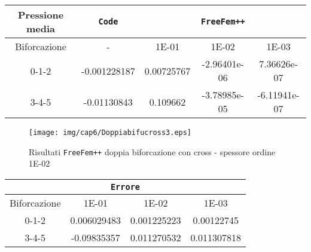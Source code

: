 \begin{center}
\begin{tabular}{|c|c|c|c|c|}
\hline
 Pressione media & \textbf{\texttt{Code}} & \multicolumn{3}{|c|}{\textbf{\texttt{FreeFem++}}} \\ 
\hline
\multicolumn{1}{|c|}{Biforcazione} & - &
\multicolumn{1}{|c|}{1E-01} & 1E-02 & 1E-03 \\
\hline
  0-1-2 & -0.001228187 & 0.00725767 & -2.96401e-06 & 7.36626e-07 \\
  3-4-5 & -0.01130843 & 0.109662 & -3.78985e-05 & -6.11941e-07 \\
\hline
\end{tabular}
\end{center}

\begin{center}
\begin{figure}[h!]
\centering
\texttt{[image: img/cap6/Doppiabifucross3.eps]}
\caption{Risultati \texttt{FreeFem++} doppia biforcazione con cross - spessore ordine 1E-02 }\label{DoppiaBifuCross1E-02}
\end{figure}
\end{center}

\begin{center}
\begin{tabular}{|c|c|c|c|}
\hline
  \multicolumn{4}{|c|}{\textbf{\texttt{Errore}}} \\ 
\hline
\multicolumn{1}{|c|}{Biforcazione} &
\multicolumn{1}{|c|}{1E-01} & 1E-02 & 1E-03 \\
\hline
  0-1-2 &  0.006029483 & 0.001225223 & 0.00122745 \\
  3-4-5 & -0.09835357 & 0.011270532 & 0.011307818 \\
\hline
\end{tabular}
\end{center}